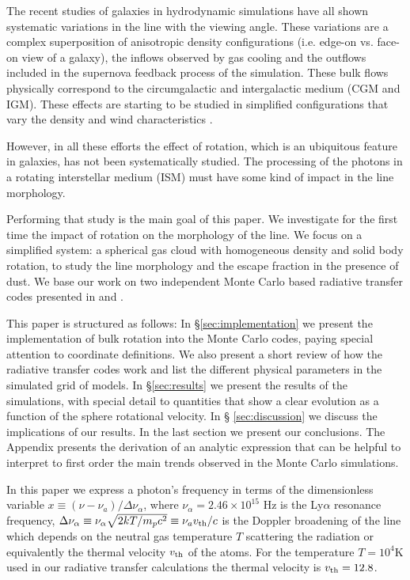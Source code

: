 \documentclass{emulateapj}
\newcommand{\ly}{{\ifmmode{{\rm Ly}\alpha~}\else{Ly$\alpha$~}\fi}}
\newcommand{\kms}{{\ifmmode{{\mathrm{\,km\ s}^{-1}}}\else{\,km~s$^{-1}$}\fi}}
\begin{document}
The recent studies of galaxies in hydrodynamic simulations
\citep{Laursen09,Barnes11,Verhamme12,Yajima12} have all shown
systematic variations in the \ly line with the viewing angle. These
variations are a complex superposition of anisotropic density
configurations (i.e. edge-on vs. face-on view of a galaxy), the
inflows observed by gas cooling and the outflows included in the
supernova feedback process of the simulation. These bulk flows
physically correspond to the circumgalactic and intergalactic medium
(CGM and IGM). These effects are starting to be studied
 in simplified configurations that vary the density and wind
 characteristics \citep{Zheng2013,Behrens2014}. 

However, in all these efforts the effect of rotation,
which is an ubiquitous feature in galaxies, has not been
systematically studied. The processing of the \ly photons in a
rotating interstellar medium (ISM) must have some kind of impact in
the \ly line morphology. 

Performing that study is the main goal of this paper. We investigate for the
first time the impact of rotation on the morphology of the \ly
line. We focus on a simplified system: a spherical gas cloud with
homogeneous density and solid body rotation, to study the line
morphology and the escape fraction in the presence of dust. We base
our work on two independent Monte Carlo based radiative transfer codes
presented in \cite{CLARA} and \cite{DijkstraKramer}.   
  
This paper is structured as follows: In \S \ref{sec:implementation} we
present the implementation of bulk rotation into the Monte Carlo
codes, paying special attention to coordinate definitions. We also
present a short review of how the \ly radiative transfer codes work
and list the different physical parameters in the simulated grid of
models. In \S \ref{sec:results} we present the results of the
simulations, with special detail to quantities that show a
clear evolution as a function of the sphere rotational velocity. In \S
\ref{sec:discussion} we discuss the implications of our results. In
the last section we present our conclusions. The Appendix presents the
derivation of an analytic expression that can be helpful to interpret
to first order the main trends observed in the Monte Carlo simulations.


In this paper we express a photon's frequency in terms of the
dimensionless variable $x\equiv (\nu -\nu_a)/\Delta\nu_\alpha$, where
$\nu_{\alpha}=2.46\times 10^{15}$ Hz is the Ly$\alpha$ resonance
frequency,  $\Delta\nu_{\alpha} \equiv
\nu_{\alpha}\sqrt{2kT/m_pc^2}\equiv \nu_av_{\rm th}/c $ is the Doppler
broadening of the line which depends on the neutral gas temperature
$T$ scattering the radiation or equivalently the thermal velocity
$v_{\rm th}$ of the atoms.  For the temperature $T=10^4$K used in our
radiative transfer calculations the thermal velocity is
$v_{\rm th}=12.8$\kms.  
\end{document}
